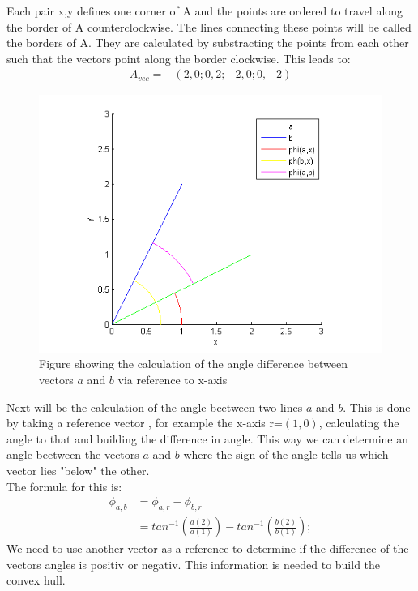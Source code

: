 Each pair x,y defines one corner of A and the points are ordered to travel along the border of A counterclockwise.
The lines connecting these points will be called the borders of A. They are calculated by substracting the points from each other such that the vectors point along the border clockwise. This leads to:
\begin{align*}
A_{vec} = 	&( 2 , 0 ; 0 ,2 ;-2, 0; 0, -2)	
\end{align*}

\begin{figure}[H]
\includegraphics{VectorDegree}
\caption{Figure showing the calculation of the angle difference between vectors $a$ and $b$ via reference to x-axis}
 \end{figure}

Next will be the calculation of the angle beetween two lines $a$ and $b$. This is done by taking a reference vector , for example the x-axis r=$(1,0)$, calculating the angle to that and building the difference in angle. This way we can determine an angle beetween the vectors $a$ and $b$ where the sign of the angle tells us which vector lies "below" the other.\\
The formula for this is:
\begin{align*}
  \phi_{a,b} &= \phi_{a,r} - \phi_{b,r}\\
	&= tan^{-1} ( \frac{ a(2) }{  a(1) } ) - tan^{-1} ( \frac{b(2)}{b(1)}); 
\end{align*}
We need to use another vector as a reference to determine if the difference of the vectors angles is positiv or negativ. This information is needed to build the convex hull.


